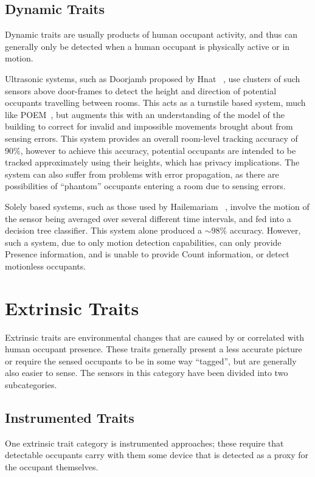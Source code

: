 \documentclass[../thesis/thesis.tex]{subfiles}
\begin{document}
\subsection{Dynamic Traits}
\label{subsubsec:litreview:sensors:intrinsic:dynamic}
Dynamic traits are usually products of human occupant activity, and thus can generally only be detected when a human occupant is physically active or in motion.

Ultrasonic systems, such as Doorjamb proposed by Hnat \etal~\cite{hnat2012doorjamb}, use clusters of such sensors above door-frames to detect the height and direction of potential occupants travelling between rooms. This acts as a turnstile based system, much like POEM~\cite{erickson2013poem}, but augments this with an understanding of the model of the building to correct for invalid and impossible movements brought about from sensing errors. This system provides an overall room-level tracking accuracy of 90\%, however to achieve this accuracy, potential occupants are intended to be tracked approximately using their heights, which has privacy implications. The system can also suffer from problems with error propagation, as there are possibilities of ``phantom'' occupants entering a room due to sensing errors.

Solely \pir based systems, such as those used by Hailemariam \etal~\cite{hailemariam2011real}, involve the motion of the sensor being averaged over several different time intervals, and fed into a decision tree classifier. This \pir system alone produced a $\sim98\%$ accuracy. However, such a system, due to only motion detection capabilities, can only provide Presence information, and is unable to provide Count information, or detect motionless occupants.

\section{Extrinsic Traits}
\label{subsec:litreview:sensors:extrinsic}
Extrinsic traits are environmental changes that are caused by or correlated with human occupant presence. These traits generally present a less accurate picture or require the sensed occupants to be in some way ``tagged'', but are generally also easier to sense. The sensors in this category have been divided into two subcategories.

\subsection{Instrumented Traits}
\label{subsubsec:litreview:sensors:extrinsic:instrumented}
One extrinsic trait category is instrumented approaches; these require that detectable occupants carry with them some device that is detected as a proxy for the occupant themselves.
\end{document}
